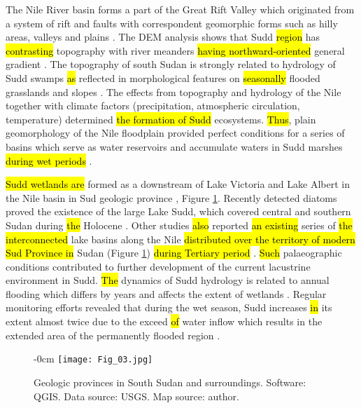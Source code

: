 \documentclass[sustainability,article,submit,pdftex,moreauthors]{Definitions/mdpi}
\begin{document}
The Nile River basin forms a part of the Great Rift Valley which originated from a system of rift and faults with correspondent geomorphic forms such as hilly areas, valleys and plains \cite{CHOROWICZ2005379,Lemenkova202206}. The\hl{ }DEM analysis shows that\hl{ }Sudd \hl{region} has \hl{contrasting} topography with river meanders\hl{ having northward-oriented} general gradient \cite{PetersenFohrer}. The topography of south Sudan is strongly related to hydrology of Sudd swamps \hl{as} reflected in morphological features on\hl{ seasonally }flooded grasslands and slopes \cite{Petersenetal2008}. The effects from topography and hydrology of the Nile together with climate factors (precipitation, atmospheric circulation, temperature) determined \hl{the formation of Sudd }ecosystems. \hl{Thus}, plain geomorphology of the Nile floodplain provided perfect conditions for\hl{ }a series of basins which serve as water reservoirs and accumulate waters in Sudd marshes \hl{during wet periods} \cite{Sutcliffe}. 

\hl{Sudd wetlands are }formed as a downstream of Lake Victoria and Lake Albert in the Nile basin in Sud geologic province \cite{1792135}, Figure \ref{fig03}. Recently detected diatoms proved the existence of the large Lake Sudd, which covered central and southern Sudan during \hl{the }Holocene \cite{ELSHAFIE201113}. Other studies \hl{also }reported \hl{an existing} series of \hl{the interconnected} lake basins\hl{ }along the\hl{ }Nile \hl{distributed over the territory of modern Sud Province in }Sudan (Figure \ref{fig03}) \hl{during Tertiary period }\cite{SALAMA1987899}. \hl{Such} palaeographic conditions contributed to further development of the current lacustrine environment in Sudd. \hl{The} dynamics of Sudd hydrology is related to annual flooding which differs by years and affects the extent of wetlands \cite{gabr2013implications}. Regular monitoring efforts revealed that during the wet season,\hl{ }Sudd increases \hl{in }its extent almost twice due to the exceed \hl{of }water inflow which results in the extended area of the permanently flooded region \cite{WILUSZ2017205}. 

\begin{figure}[H]
\begin{adjustwidth}{-\extralength}{0cm}
	\hspace{130pt}\texttt{[image: Fig\_03.jpg]}
\end{adjustwidth}
\caption{Geologic provinces in South Sudan and surroundings. Software: QGIS. Data source: USGS. Map source: author.
\label{fig03}}
\end{figure}
\end{document}

